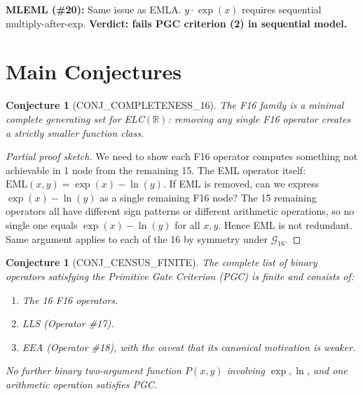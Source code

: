 \documentclass[11pt]{article}
\newtheorem{conjecture}[theorem]{Conjecture}
\begin{document}
\medskip
\textbf{MLEML (\#20):}
Same issue as EMLA. $y \cdot \exp(x)$ requires sequential multiply-after-exp.
\textbf{Verdict: fails PGC criterion (2) in sequential model.}

\section{Main Conjectures}
\label{sec:conjectures}

\begin{conjecture}[CONJ\_COMPLETENESS\_16]
The F16 family is a \emph{minimal complete generating set} for ELC$(\mathbb{R})$:
removing any single F16 operator creates a strictly smaller function class.
\end{conjecture}

\begin{proof}[Partial proof sketch]
We need to show each F16 operator computes something not achievable in 1 node
from the remaining 15. The EML operator itself: $\mathrm{EML}(x,y) = \exp(x)-\ln(y)$.
If EML is removed, can we express $\exp(x)-\ln(y)$ as a single remaining F16 node?
The 15 remaining operators all have different sign patterns or different arithmetic operations,
so no single one equals $\exp(x)-\ln(y)$ for all $x,y$. Hence EML is not redundant.
Same argument applies to each of the 16 by symmetry under $\mathcal{G}_{16}$.
\end{proof}

\begin{conjecture}[CONJ\_CENSUS\_FINITE]
The complete list of binary operators satisfying the Primitive Gate Criterion (PGC)
is finite and consists of:
\begin{enumerate}
  \item The 16 F16 operators.
  \item LLS (Operator \#17).
  \item EEA (Operator \#18), with the caveat that its canonical motivation is weaker.
\end{enumerate}
No further binary two-argument function $P(x,y)$ involving $\exp, \ln$, and
one arithmetic operation satisfies PGC.
\end{conjecture}
\end{document}
